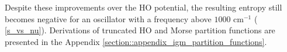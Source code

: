 \documentclass[../main.tex]{subfiles}
\begin{document}

Despite these improvements over the HO potential, the resulting entropy still becomes negative for an oscillator with a frequency above $1000$ cm$^{-1}$ (\figurename{ \ref{s_vs_nu}}). Derivations of truncated HO and Morse partition functions are presented in the Appendix \ref{section::appendix_igm_partition_functions}.
\end{document}
